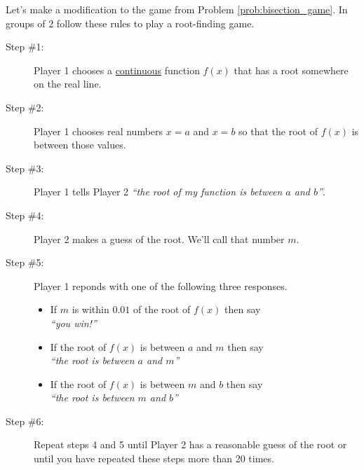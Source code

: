 
\begin{problem}
    Let's make a modification to the game from Problem \ref{prob:bisection_game}.  In
    groups of 2 follow these rules to play a root-finding game.
    \begin{description}
        \item[Step \#1:] Player 1 chooses a \underline{continuous} function $f(x)$ that
            has a root somewhere on the real line.  
        \item[Step \#2:] Player 1 chooses real numbers $x=a$ and $x=b$ so that the root of
            $f(x)$ is between those values.
        \item[Step \#3:] Player 1 tells Player 2 {\it ``the root of my function is between
            $a$ and $b$''}.
        \item[Step \#4:] Player 2 makes a guess of the root.  We'll call that number $m$.
        \item[Step \#5:] Player 1 reponds with one of the following three responses.
            \begin{itemize}
                \item If $m$ is within $0.01$ of the root of $f(x)$ then say \\ {\it ``you
                    win!''}
                \item If the root of $f(x)$ is between $a$ and $m$ then say \\ {\it ``the
                    root is between $a$ and $m$''}
                \item If the root of $f(x)$ is between $m$ and $b$ then say \\ {\it ``the
                    root is between $m$ and $b$''}
            \end{itemize}
        \item[Step \#6:] Repeat steps 4 and 5 until Player 2 has a reasonable guess of the
            root or until you have repeated these steps more than 20 times.
    \end{description}
\end{problem}

